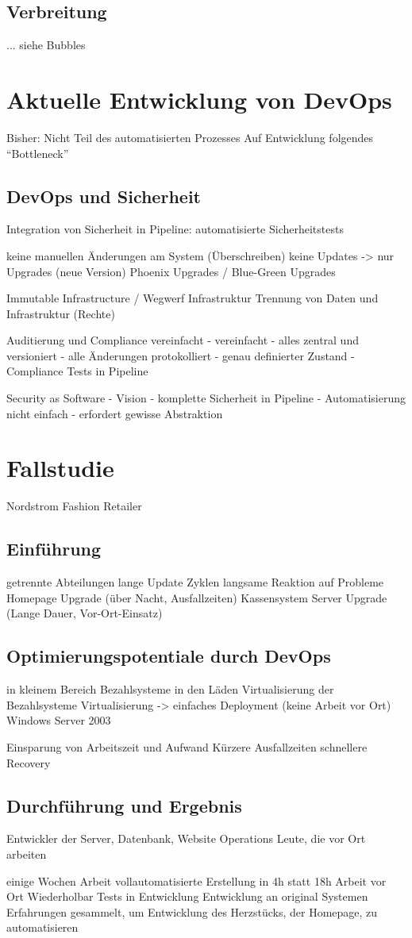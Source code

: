\subsection{Verbreitung}
... siehe Bubbles


\section{Aktuelle Entwicklung von DevOps} %
Bisher:
Nicht Teil des automatisierten Prozesses
Auf Entwicklung folgendes “Bottleneck”

\subsection{DevOps und Sicherheit}
Integration von Sicherheit in Pipeline: automatisierte Sicherheitstests

keine manuellen Änderungen am System (Überschreiben)
keine Updates -> nur Upgrades (neue Version)
Phoenix Upgrades / Blue-Green Upgrades

Immutable Infrastructure / Wegwerf Infrastruktur
Trennung von Daten und Infrastruktur (Rechte)

Auditierung und Compliance vereinfacht
- vereinfacht
- alles zentral und versioniert
- alle Änderungen protokolliert
- genau definierter Zustand
- Compliance Tests in Pipeline

Security as Software
- Vision
- komplette Sicherheit in Pipeline
- Automatisierung nicht einfach
- erfordert gewisse Abstraktion


\section{Fallstudie} %
Nordstrom Fashion Retailer

\subsection{Einführung}
getrennte Abteilungen
lange Update Zyklen
langsame Reaktion auf Probleme
Homepage Upgrade (über Nacht, Ausfallzeiten)
Kassensystem Server Upgrade (Lange Dauer, Vor-Ort-Einsatz)

\subsection{Optimierungspotentiale durch DevOps}
in kleinem Bereich
Bezahlsysteme in den Läden
Virtualisierung der Bezahlsysteme
Virtualisierung -> einfaches Deployment (keine Arbeit vor Ort)
Windows Server 2003

Einsparung von Arbeitszeit und Aufwand
Kürzere Ausfallzeiten
schnellere Recovery

\subsection{Durchführung und Ergebnis}
Entwickler der Server, Datenbank, Website
Operations Leute, die vor Ort arbeiten

einige Wochen Arbeit
vollautomatisierte Erstellung in 4h statt 18h Arbeit vor Ort
Wiederholbar
Tests in Entwicklung
Entwicklung an original Systemen
Erfahrungen gesammelt, um Entwicklung des Herzstücks, der Homepage, zu automatisieren
